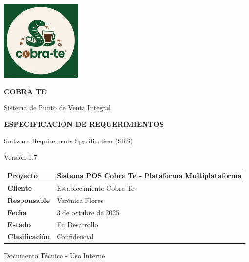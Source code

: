 \documentclass[12pt,letterpaper]{article}
\begin{document}
\begin{titlepage}
    \centering
    \vspace*{1cm}
    
    \includegraphics[width=4cm]{Logo.png}
    
    \vspace{1cm}
    {\color{cobrablue}\Huge\textbf{COBRA TE}}
    
    \vspace{0.5cm}
    {\color{cobraorange}\Large Sistema de Punto de Venta Integral}
    
    \vspace{2cm}
    {\color{cobragray}\LARGE\textbf{ESPECIFICACIÓN DE REQUERIMIENTOS}}
    
    \vspace{0.3cm}
    {\color{cobragray}\large Software Requirements Specification (SRS)}
    
    \vspace{1cm}
    {\color{cobragray}\large Versión 1.7}
    
    \vspace{2cm}
    \begin{tabular}{|p{4cm}|p{8cm}|}
        \hline
        \rowcolor{cobrablue!20}
        \textbf{Proyecto} & Sistema POS Cobra Te - Plataforma Multiplataforma \\
        \hline
        \textbf{Cliente} & Establecimiento Cobra Te \\
        \hline
        \textbf{Responsable} & Verónica Flores \\
        \hline
        \textbf{Fecha} & 3 de octubre de 2025 \\
        \hline
        \textbf{Estado} & En Desarrollo \\
        \hline
        \textbf{Clasificación} & Confidencial \\
        \hline
    \end{tabular}
    
    \vfill
    {\color{cobragray}\large Documento Técnico - Uso Interno}
    
\end{titlepage}
\end{document}
